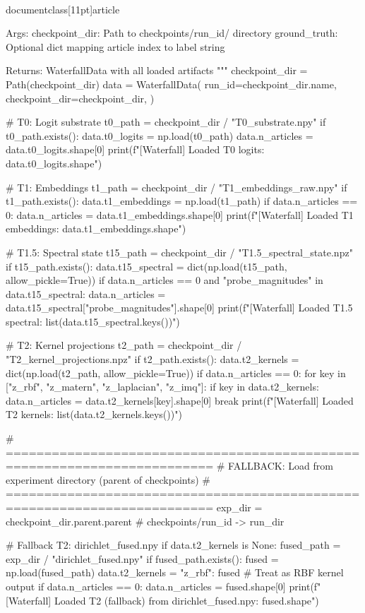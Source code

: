 \\documentclass[11pt]{article}
\begin{document}
\begin{CodeBlock}
    Args:
        checkpoint_dir: Path to checkpoints/{run_id}/ directory
        ground_truth: Optional dict mapping article index to label string

    Returns:
        WaterfallData with all loaded artifacts
    """
    checkpoint_dir = Path(checkpoint_dir)
    data = WaterfallData(
        run_id=checkpoint_dir.name,
        checkpoint_dir=checkpoint_dir,
    )

    # T0: Logit substrate
    t0_path = checkpoint_dir / "T0_substrate.npy"
    if t0_path.exists():
        data.t0_logits = np.load(t0_path)
        data.n_articles = data.t0_logits.shape[0]
        print(f"[Waterfall] Loaded T0 logits: {data.t0_logits.shape}")

    # T1: Embeddings
    t1_path = checkpoint_dir / "T1_embeddings_raw.npy"
    if t1_path.exists():
        data.t1_embeddings = np.load(t1_path)
        if data.n_articles == 0:
            data.n_articles = data.t1_embeddings.shape[0]
        print(f"[Waterfall] Loaded T1 embeddings: {data.t1_embeddings.shape}")

    # T1.5: Spectral state
    t15_path = checkpoint_dir / "T1.5_spectral_state.npz"
    if t15_path.exists():
        data.t15_spectral = dict(np.load(t15_path, allow_pickle=True))
        if data.n_articles == 0 and "probe_magnitudes" in data.t15_spectral:
            data.n_articles = data.t15_spectral["probe_magnitudes"].shape[0]
        print(f"[Waterfall] Loaded T1.5 spectral: {list(data.t15_spectral.keys())}")

    # T2: Kernel projections
    t2_path = checkpoint_dir / "T2_kernel_projections.npz"
    if t2_path.exists():
        data.t2_kernels = dict(np.load(t2_path, allow_pickle=True))
        if data.n_articles == 0:
            for key in ["z_rbf", "z_matern", "z_laplacian", "z_imq"]:
                if key in data.t2_kernels:
                    data.n_articles = data.t2_kernels[key].shape[0]
                    break
        print(f"[Waterfall] Loaded T2 kernels: {list(data.t2_kernels.keys())}")

    # =========================================================================
    # FALLBACK: Load from experiment directory (parent of checkpoints)
    # =========================================================================
    exp_dir = checkpoint_dir.parent.parent  # checkpoints/{run_id} -> {run_dir}

    # Fallback T2: dirichlet_fused.npy
    if data.t2_kernels is None:
        fused_path = exp_dir / "dirichlet_fused.npy"
        if fused_path.exists():
            fused = np.load(fused_path)
            data.t2_kernels = {"z_rbf": fused}  # Treat as RBF kernel output
            if data.n_articles == 0:
                data.n_articles = fused.shape[0]
            print(f"[Waterfall] Loaded T2 (fallback) from dirichlet_fused.npy: {fused.shape}")


\end{CodeBlock}
\end{document}
